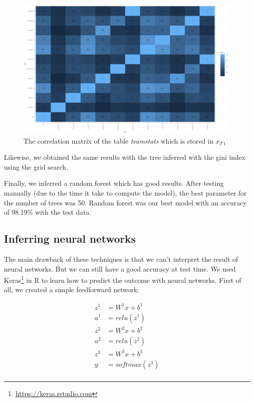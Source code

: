 \documentclass{article}
\begin{document}
\begin{figure}[!hb]
  \includegraphics[scale=0.2]{cor1.png}
  \centering
  \caption{The correlation matrix of the table \emph{teamstats} which is stored in $x_{\mathcal{T}1}$}
  \label{fig:cor1}
\end{figure}

Likewise, we obtained the same results with the tree inferred with the gini index using the grid search.

Finally, we inferred a random forest which has good results. After testing manually (due to the time it take to compute the model), the best parameter for the number of trees was 50. Random forest was our best model with an accuracy of 98.19\% with the test data. 

\subsection{Inferring neural networks}

The main drawback of these techniques is that we can't interpret the result of neural networks. But we can still have a good accuracy at test time. We used Keras\footnote{\url{https://keras.rstudio.com}} in R to learn how to predict the outcome with neural networks. First of all, we created a simple feedforward network:

\begin{align*}
z^{1} &= W^{1}x+b^{1}\\
a^{1} &= relu(z^{1})\\
z^{2} &= W^{2}x+b^{2}\\
a^{2} &= relu(z^{2})\\
z^{3} &= W^{3}x+b^{3}\\
y &= softmax(z^{3})\\
\end{align*}
\end{document}
